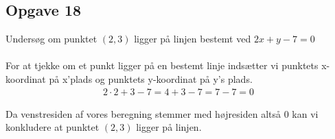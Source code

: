 \subsection{Opgave 18}

Undersøg om punktet $(2,3)$ ligger på linjen bestemt ved $2x + y - 7 = 0$\\\\

\ans
For at tjekke om et punkt ligger på en bestemt linje indsætter vi punktets x-koordinat på x'plads og punktets y-koordinat på y's plads.
\begin{align*}
    2\cdot 2 + 3 - 7 = 4 + 3 -7 = 7-7 =0
\end{align*}

Da venstresiden af vores beregning stemmer med højresiden altså 0 kan vi konkludere at punktet $(2,3)$ ligger på linjen.